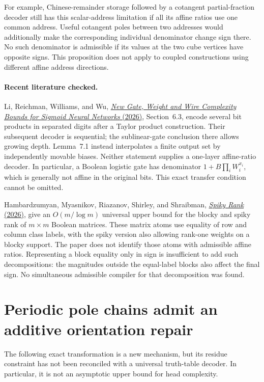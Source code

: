 \documentclass[11pt]{article}
\begin{document}
For example, Chinese-remainder storage followed by a cotangent
partial-fraction decoder still has this scalar-address limitation if
all its affine ratios use one common address. Useful cotangent poles
between two addresses would additionally make the corresponding
individual denominator change sign there. No such denominator is
admissible if its values at the two cube vertices have opposite signs.
This proposition does not apply to coupled constructions using
different affine address directions.

\paragraph{Recent literature checked.}
Li, Reichman, Williams, and Wu,
\href{https://arxiv.org/html/2611.21910v1}{\emph{New Gate, Weight and
Wire Complexity Bounds for Sigmoid Neural Networks} (2026)},
Section~6.3, encode several bit products in separated digits after a
Taylor product construction. Their subsequent decoder is sequential;
the sublinear-gate conclusion there allows growing depth. Lemma~7.1
instead interpolates a finite output set by independently movable
biases. Neither statement supplies a one-layer affine-ratio decoder.
In particular, a Boolean logistic gate has denominator
$1+B\prod_i W_i^{x_i}$, which is generally not affine in the original
bits. This exact transfer condition cannot be omitted.

Hambardzumyan, Myasnikov, Riazanov, Shirley, and Shraibman,
\href{https://eccc.weizmann.ac.il/report/2026/030/download/}{\emph{Spiky
Rank} (2026)}, give an $O(m/\log m)$ universal upper bound for the
blocky and spiky rank of $m\times m$ Boolean matrices. These matrix
atoms use equality of row and column class labels, with the spiky
version also allowing rank-one weights on a blocky support. The
paper does not identify those atoms with admissible affine ratios.
Representing a block equality only in sign is insufficient to add
such decompositions: the magnitudes outside the equal-label blocks
also affect the final sign. No simultaneous admissible compiler for
that decomposition was found.


\section{Periodic pole chains admit an additive orientation repair}

The following exact transformation is a new mechanism, but its residue
constraint has not been reconciled with a universal truth-table decoder.
In particular, it is not an asymptotic upper bound for head complexity.
\end{document}
